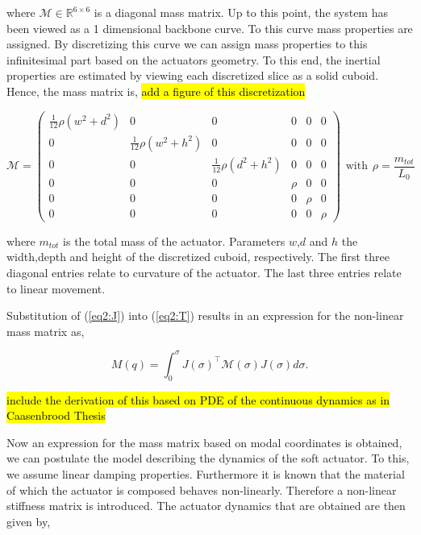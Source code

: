 where $\mathcal{M} \in \mathbb{R}^{6\times6}$ is a diagonal mass matrix. Up to this point, the system has been viewed as a 1 dimensional backbone curve. To this curve mass properties are assigned. By discretizing this curve we can assign mass properties to this infinitesimal part based on the actuators geometry. To this end, the inertial properties are estimated by viewing each discretized slice as a solid cuboid. Hence, the mass matrix is,
\hl{add a figure of this discretization}

\begin{equation}
    \mathcal{M} = \begin{pmatrix} \frac{1}{12}\rho (w^2 + d^2) & 0 & 0 & 0 & 0 & 0 \\
                                  0 & \frac{1}{12}\rho (w^2 + h^2) & 0 & 0 & 0 & 0 \\
                                  0 & 0 & \frac{1}{12}\rho (d^2 + h^2) & 0 & 0 & 0 \\
                                  0 & 0 & 0 & \rho & 0 & 0 \\
                                  0 & 0 & 0 & 0 & \rho & 0 \\
                                  0 & 0 & 0 & 0 & 0 & \rho \end{pmatrix}\hspace{5pt} \text{with} \hspace{5pt} \rho = \frac{m_{tot}}{L_0}
\end{equation} 




where $m_{tot}$ is the total mass of the actuator. Parameters $w$,$d$ and $h$ the width,depth and height of the discretized cuboid, respectively. The first three diagonal entries relate to curvature of the actuator. The last three entries relate to linear movement.


Substitution of (\ref{eq2:J}) into (\ref{eq2:T}) results in an expression for the non-linear mass matrix as,


\begin{equation}
    M(q) = \int_0^{\sigma} J(\sigma)^\top \mathcal{M}(\sigma)J(\sigma) d \sigma.
\end{equation}


\hl{include the derivation of this based on PDE of the continuous dynamics as in Caasenbrood Thesis} \cite{Caasenbrood2020} 

Now an expression for the mass matrix based on modal coordinates is obtained, we can postulate the model describing the dynamics of the soft actuator. To this, we assume linear damping properties. Furthermore it is known that the material of which the actuator is composed behaves non-linearly. Therefore a non-linear stiffness matrix is introduced. The actuator dynamics that are obtained are then given by,

